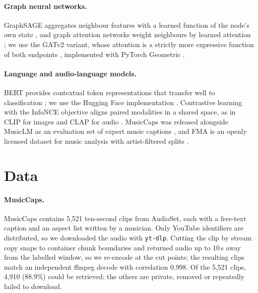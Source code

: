 \documentclass{article}
\begin{document}
\paragraph{Graph neural networks.}
GraphSAGE aggregates neighbour features with a learned function of the node's own state
\citep{hamilton2017graphsage}, and graph attention networks weight neighbours by learned attention
\citep{velickovic2018gat}; we use the GATv2 variant, whose attention is a strictly more expressive function of both
endpoints \citep{brody2022gatv2}, implemented with PyTorch Geometric \citep{fey2019pyg}.

\paragraph{Language and audio-language models.}
BERT provides contextual token representations that transfer well to classification \citep{devlin2019bert}; we use the
Hugging Face implementation \citep{wolf2020transformers}. Contrastive learning with the InfoNCE objective
\citep{oord2018cpc} aligns paired modalities in a shared space, as in CLIP for images \citep{radford2021clip} and CLAP
for audio \citep{elizalde2023clap}. MusicCaps was released alongside MusicLM as an evaluation set of expert music
captions \citep{agostinelli2023musiclm}, and FMA is an openly licensed dataset for music analysis with
artist-filtered splits \citep{defferrard2017fma}.

\section{Data}
\label{sec:data}

\paragraph{MusicCaps.}
MusicCaps contains 5,521 ten-second clips from AudioSet, each with a free-text caption and an aspect list written by a
musician. Only YouTube identifiers are distributed, so we downloaded the audio with \texttt{yt-dlp}. Cutting the clip
by stream copy snaps to container chunk boundaries and returned audio up to 10\,s away from the labelled window, so we
re-encode at the cut points; the resulting clips match an independent ffmpeg decode with correlation 0.998. Of the
5,521 clips, 4,910 (88.9\%) could be retrieved; the others are private, removed or repeatedly failed to download.
\end{document}
